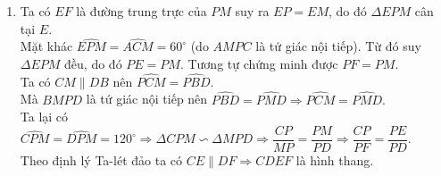 \begin{bt}
{\begin{enumerate}
        Từ đó suy ra $\Delta CPM\backsim \Delta CMB \Rightarrow \dfrac{CP}{CM}=\dfrac{CM}{CB} \Rightarrow CP.CB=CM^2 \Rightarrow CM=\sqrt{CP.CB}$.\\
        Tương tự ta chứng minh được $DM=\sqrt{DP.DA}$.\\
        Vậy $\sqrt{CP.CB}+\sqrt{DP.DA}=CM+DM=AM+BM=AB.$
        \item Ta có $EF$ là đường trung trực của $PM$ suy ra $EP=EM$, do đó $\Delta EPM$ cân tại $E$.\\
        Mặt khác $\widehat{EPM}=\widehat{ACM}=60^{\circ}$ (do $AMPC$ là tứ giác nội tiếp). Từ đó suy $\Delta EPM$ đều, do đó $PE=PM$. Tương tự chứng minh được $PF=PM$.\\
        Ta có $CM\parallel DB$ nên $\widehat{PCM}=\widehat{PBD}$.\\
        Mà $BMPD$ là tứ giác nội tiếp nên $\widehat{PBD}=\widehat{PMD} \Rightarrow \widehat{PCM}=\widehat{PMD}.$\\
        Ta lại có $\widehat{CPM}=\widehat{DPM}=120^{\circ} \Rightarrow \Delta CPM\backsim \Delta MPD \Rightarrow \dfrac{CP}{MP}=\dfrac{PM}{PD} \Rightarrow \dfrac{CP}{PF}=\dfrac{PE}{PD}$.\\
        Theo định lý Ta-lét đảo ta có $CE\parallel DF\Rightarrow CDEF$ là hình thang.
\end{enumerate}
}
\end{bt}



